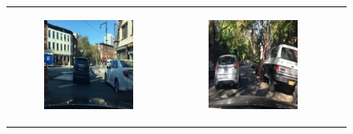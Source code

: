 \begin{figure}
\begin{tabular}{p{\horspace} p{\horspace} p{\horspace}}
\begin{subfigure}[b]{\subfigwidth}
        \includegraphics[width=\subfigwidth]{images/gpt4/s2.jpg}
    \end{subfigure} 
    \hfill &
    \begin{subfigure}[b]{\subfigwidth}
        \includegraphics[width=\subfigwidth]{images/gpt4/s3.jpg}

\end{subfigure}
\end{tabular}
\end{figure}
